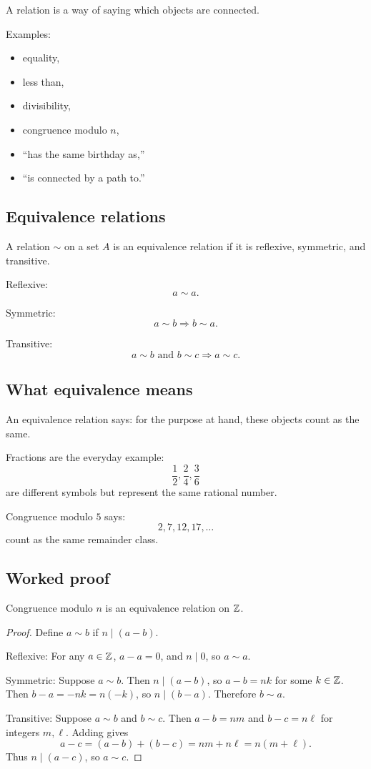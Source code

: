 \documentclass[12pt]{article}
\begin{document}
A relation is a way of saying which objects are connected.

Examples:

\begin{itemize}
\item equality,
\item less than,
\item divisibility,
\item congruence modulo $n$,
\item ``has the same birthday as,''
\item ``is connected by a path to.''
\end{itemize}

\subsection{Equivalence relations}

\begin{definition}
A relation $\sim$ on a set $A$ is an equivalence relation if it is reflexive, symmetric, and transitive.
\end{definition}

Reflexive:
\[
a\sim a.
\]

Symmetric:
\[
a\sim b\Rightarrow b\sim a.
\]

Transitive:
\[
a\sim b\text{ and }b\sim c\Rightarrow a\sim c.
\]

\subsection{What equivalence means}

An equivalence relation says: for the purpose at hand, these objects count as the same.

Fractions are the everyday example:
\[
\frac12,\frac24,\frac36
\]
are different symbols but represent the same rational number.

Congruence modulo $5$ says:
\[
2,7,12,17,\ldots
\]
count as the same remainder class.

\subsection{Worked proof}

\begin{theorem}
Congruence modulo $n$ is an equivalence relation on $\mathbb{Z}$.
\end{theorem}

\begin{proof}
Define $a\sim b$ if $n\mid(a-b)$.

Reflexive: For any $a\in\mathbb{Z}$, $a-a=0$, and $n\mid0$, so $a\sim a$.

Symmetric: Suppose $a\sim b$. Then $n\mid(a-b)$, so $a-b=nk$ for some $k\in\mathbb{Z}$. Then $b-a=-nk=n(-k)$, so $n\mid(b-a)$. Therefore $b\sim a$.

Transitive: Suppose $a\sim b$ and $b\sim c$. Then $a-b=nm$ and $b-c=n\ell$ for integers $m,\ell$. Adding gives
\[
a-c=(a-b)+(b-c)=nm+n\ell=n(m+\ell).
\]
Thus $n\mid(a-c)$, so $a\sim c$.
\end{proof}
\end{document}
